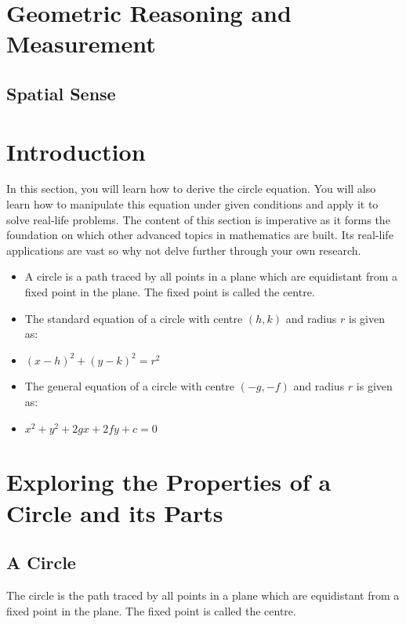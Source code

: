 \section*{Geometric Reasoning and Measurement}
\subsection*{Spatial Sense}

\section{Introduction}

In this section, you will learn how to derive the circle equation. You will also
learn how to manipulate this equation under given conditions and apply it to
solve real-life problems. The content of this section is imperative as it forms the
foundation on which other advanced topics in mathematics are built. Its real-life
applications are vast so why not delve further through your own research.

\begin{keyideas}
\begin{itemize}
  \item A circle is a path traced by all points in a plane which are equidistant
  from a fixed point in the plane. The fixed point is called the centre.
  \item The standard equation of a circle with centre $(h, k)$ and radius $r$ is given
  as:
  \item $(x - h)^2 + (y - k)^2 = r^2$
  \item The general equation of a circle with centre $(-g, -f)$ and radius $r$ is
  given as:
  \item $x^2 + y^2 + 2gx + 2fy + c = 0$
\end{itemize}
\end{keyideas}

\section{Exploring the Properties of a Circle and its Parts}

\subsection{A Circle}

The circle is the path traced by all points in a plane which are equidistant from a
fixed point in the plane. The fixed point is called the centre.

